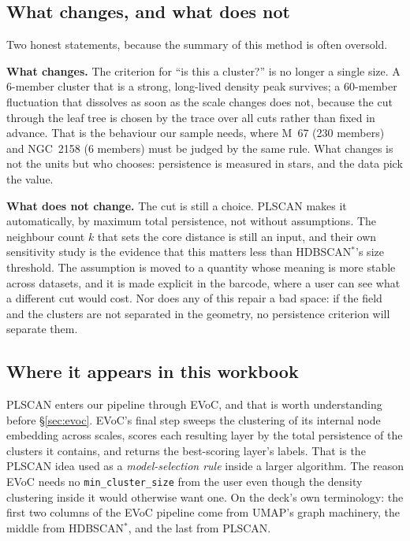 \subsection{What changes, and what does not}

Two honest statements, because the summary of this method is often oversold.

\textbf{What changes.} The criterion for ``is this a cluster?'' is no longer
a single size. A 6-member cluster that is a strong, long-lived density peak
survives; a 60-member fluctuation that dissolves as soon as the scale changes
does not, because the cut through the leaf tree is chosen by the trace over all
cuts rather than fixed in advance. That is the behaviour our sample needs, where
M~67 (230 members) and NGC~2158 (6 members) must be judged by the same rule.
What changes is not the units but who chooses: persistence is measured in stars,
and the data pick the value.

\textbf{What does not change.} The cut is still a choice. PLSCAN makes it
automatically, by maximum total persistence, not without assumptions. The
neighbour count $k$ that sets the core distance is still an input, and their
own sensitivity study is the evidence that this matters less than HDBSCAN$^*$'s
size threshold. The assumption is moved to a quantity whose meaning is more
stable across datasets, and it is made explicit in the barcode, where a user
can see what a different cut would cost. Nor does any of this repair a bad
space: if the field and the clusters are not separated in the geometry, no
persistence criterion will separate them.

\subsection{Where it appears in this workbook}

PLSCAN enters our pipeline through EVoC, and that is worth understanding before
\S\ref{sec:evoc}. EVoC's final step sweeps the clustering of its internal node
embedding across scales, scores each resulting layer by the total persistence
of the clusters it contains, and returns the best-scoring layer's labels. That
is the PLSCAN idea used as a \emph{model-selection rule} inside a larger
algorithm. The reason EVoC needs no \texttt{min\_cluster\_size} from the user
even though the density clustering inside it would otherwise want one. On the
deck's own terminology: the first two columns of the EVoC pipeline come from
UMAP's graph machinery, the middle from HDBSCAN$^*$, and the last from PLSCAN.

